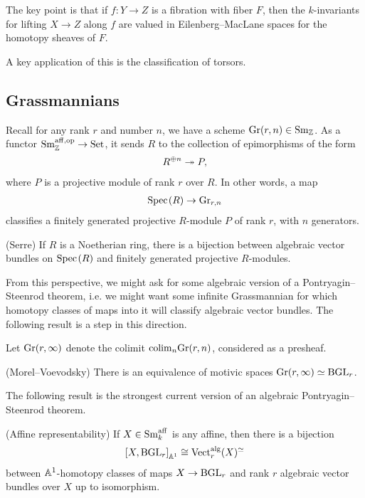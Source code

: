 \documentclass[11pt,openany]{book}
\providecommand{\aff}{\mathrm{aff}}
\begin{document}
The key point is that if $f\colon Y \to Z$ is a fibration with fiber $F$, then the $k$-invariants for lifting $X \to Z$ along $f$ are valued in Eilenberg--MacLane spaces for the homotopy sheaves of $F$.



A key application of this is the classification of torsors.



\subsection{Grassmannians}

Recall for any rank $r$ and number $n$, we have a scheme $\mathrm{Gr}(r,n) \in \mathrm{Sm}_{\mathbb{Z}}$. As a functor $\Sm_\Z^{\aff,\op} \to \Set$, it sends $R$ to the collection of epimorphisms of the form
\begin{align*}
    R^{\oplus n} \twoheadrightarrow P,
\end{align*}
where $P$ is a projective module of rank $r$ over $R$. In other words, a map
\begin{align*}
    \text{Spec}\hspace{0.1em}(R) \to \mathrm{Gr}_{r,n}
\end{align*}
classifies a finitely generated projective $R$-module $P$ of rank $r$, with $n$ generators.

\begin{theorem} (Serre) If $R$ is a Noetherian ring, there is a bijection between algebraic vector bundles on $\text{Spec}\hspace{0.1em}(R)$ and finitely generated projective $R$-modules.
\end{theorem}

From this perspective, we might ask for some algebraic version of a Pontryagin--Steenrod theorem, i.e. we might want some infinite Grassmannian for which homotopy classes of maps into it will classify algebraic vector bundles. The following result is a step in this direction.

\begin{definition} Let $\mathrm{Gr}(r,\infty)$ denote the colimit $\mathrm{colim}_n \mathrm{Gr}(r,n)$, considered as a presheaf.
\end{definition}

\begin{proposition} (Morel--Voevodsky)
There is an equivalence of motivic spaces $\mathrm{Gr}(r,\infty) \simeq \mathrm{BGL}_r$.
\end{proposition}

The following result is the strongest current version of an algebraic Pontryagin--Steenrod theorem.

\begin{theorem} (Affine representability) If $X \in \Sm_k^\aff$ is any affine, then there is a bijection
\begin{align*}
    \left[ X, \mathrm{BGL}_r \right]_{\mathbb{A}^1} \cong \mathrm{Vect}_r^{\mathrm{alg}}(X)^{\simeq}
\end{align*}
between $\mathbb{A}^1$-homotopy classes of maps $X \to \mathrm{BGL}_r$ and rank $r$ algebraic vector bundles over $X$ up to isomorphism.
\end{theorem}
\end{document}
